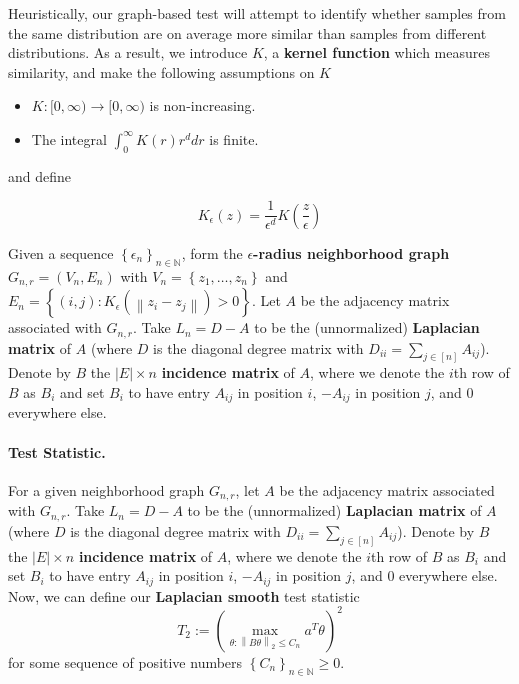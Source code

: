 \documentclass{article}
\newcommand{\norm}[1]{\left\lVert#1\right\rVert}
\newcommand{\abs}[1]{\left \lvert #1 \right \rvert}
\newcommand{\set}[1]{\left\{#1\right\}}
\newcommand{\seq}[1]{\set{#1}_{n \in \N}}
\newcommand{\N}{\mathbb{N}}
\newcommand{\1}{\mathbf{1}}
\theoremstyle{alden}
\theoremstyle{aldenthm}
\theoremstyle{remark}
\begin{document}
Heuristically, our graph-based test will attempt to identify whether samples from the same distribution are on average more similar than samples from different distributions. As a result, we introduce $K$, a \textbf{kernel function} which measures similarity, and make the following assumptions on $K$
\begin{itemize}
	\item $K: [0,\infty) \to [0,\infty)$ is non-increasing.
	\item The integral $\int_{0}^{\infty} K(r) r^d dr$ is finite.
\end{itemize}

and define 

\begin{equation*}
K_{\epsilon}(z) = \frac{1}{\epsilon^d} K\left(\frac{z}{\epsilon}\right)
\end{equation*}


Given a sequence $\seq{\epsilon_n}$, form the \textbf{$\epsilon$-radius neighborhood graph} $G_{n,r} = (V_n,E_n)$ with $V_n = \set{z_1, \ldots, z_n}$ and $E_n = \set{(i,j): K_{\epsilon}(\norm{z_i - z_j}) > 0}$. Let $A$ be the adjacency matrix associated with $G_{n,r}$. Take $L_n = D - A$ to be the (unnormalized) \textbf{Laplacian matrix} of $A$ (where $D$ is the diagonal degree matrix with $D_{ii} = \sum_{j \in [n]} A_{ij}$). Denote by $B$ the $\abs{E} \times n$ \textbf{incidence matrix} of $A$, where we denote the $i$th row of $B$ as $B_i$ and set $B_i$ to have entry $A_{ij}$ in position $i$, $-A_{ij}$ in position $j$, and $0$ everywhere else. 

\paragraph{Test Statistic.}
For a given neighborhood graph $G_{n,r}$, let $A$ be the adjacency matrix associated with $G_{n,r}$. Take $L_n = D - A$ to be the (unnormalized) \textbf{Laplacian matrix} of $A$ (where $D$ is the diagonal degree matrix with $D_{ii} = \sum_{j \in [n]} A_{ij}$). Denote by $B$ the $\abs{E} \times n$ \textbf{incidence matrix} of $A$, where we denote the $i$th row of $B$ as $B_i$ and set $B_i$ to have entry $A_{ij}$ in position $i$, $-A_{ij}$ in position $j$, and $0$ everywhere else. 
Now, we can define our \textbf{Laplacian smooth} test statistic
\begin{equation}
\label{eqn: laplacian_smooth_statistic}
T_2 := \left(\max_{\theta: \norm{B\theta}_2 \leq C_n} a^T \theta \right)^2
\end{equation}
for some sequence of positive numbers $\seq{C_n} \geq 0$.
\end{document}
